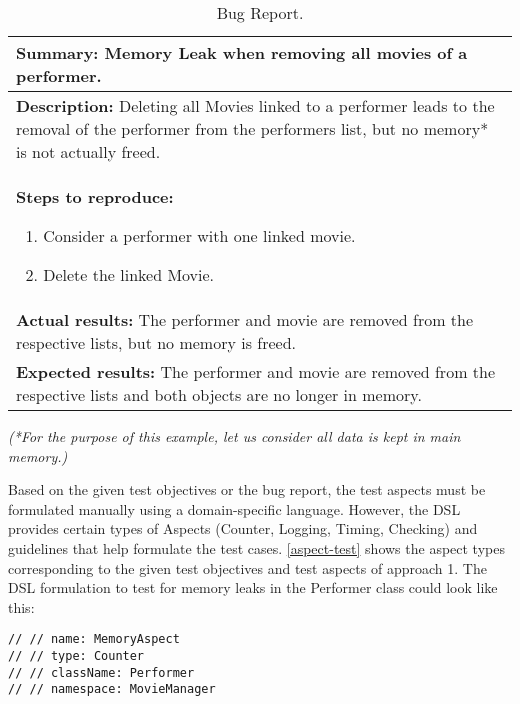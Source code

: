\begin{table}[tbh]
\begin{small}
\caption{Bug Report.}
\begin{tabular}{p{14cm}}
\hline
\textbf{Summary:} Memory Leak when removing all movies of a performer.\\
\hline
\textbf{Description:} Deleting all Movies linked to a performer leads to the removal of the performer from the performers list, but no memory* is not actually freed.\\
\hline
\textbf{Steps to reproduce:} \begin{enumerate} \item Consider a performer with one linked movie. \item Delete the linked Movie. \end{enumerate}\\
\hline
\textbf{Actual results:} The performer and movie are removed from the respective lists, but no memory is freed.\\
\hline
\textbf{Expected results:} The performer and movie are removed from the respective lists and both objects are no longer in memory.\\ 
\hline
\end{tabular}
\textit{(*For the purpose of this example, let us consider all data is kept in main memory.)}
\label{bug}
\end{small}
\end{table}


Based on the given test objectives or the bug report, the test aspects must be formulated manually using a domain-specific language. However, the DSL provides certain types of Aspects (Counter, Logging, Timing, Checking) and guidelines that help formulate the test cases. \autoref{aspect-test} shows the aspect types corresponding to the given test objectives and test aspects of approach 1. The DSL formulation to test for memory leaks in the  Performer class  could look like this:

\lstset {language=C++}
\begin{lstlisting}[caption={DSL Statement For Counter Aspect}, label=dsl]
// // name: MemoryAspect              
// // type: Counter                           
// // className: Performer    
// // namespace: MovieManager       
\end{lstlisting}

